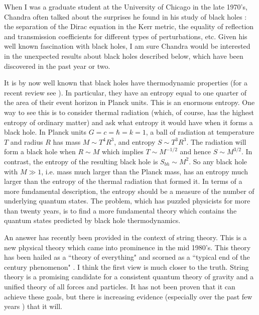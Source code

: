 
When I was a graduate student at the University of Chicago in the
late 1970's, Chandra often talked about the surprises he found in
his study of black holes \cite{chan}: the separation of the Dirac equation in
the Kerr metric, the equality of reflection and transmission
coefficients for different types of perturbations, etc. 
Given his well known fascination 
with black holes, I am sure Chandra would be interested in
the unexpected results about black holes described below,
which have been discovered in
the past year or two.

It is by now well known that black holes have
thermodynamic properties (for a recent
review see \cite{wald}). In particular, they have 
an entropy equal to one quarter of the area of their event horizon 
in Planck units.
This is an enormous entropy. One way to see this is to consider
thermal radiation (which, of course, has the highest entropy of ordinary matter)
and ask what entropy it would have when it forms a black hole. In
Planck units $G=c=\hbar=k=1$, a ball of radiation
at temperature $T$ and radius $R$ has mass $M\sim T^4 R^3$, and entropy
 $S\sim T^3 R^3$.
The radiation will form a black hole when $R\sim M$  which implies
$T \sim M^{-1/2}$ and hence $S\sim M^{3/2}$. In contrast, the entropy
of the resulting black hole is $S_{bh}\sim M^2$. So any black hole with
$M\gg 1$, i.e. mass much larger than the Planck mass, has an entropy
much larger than the entropy of the thermal radiation that formed it.
In terms of a more fundamental description, the entropy should be a measure
of the number of underlying 
quantum states. 
The problem, which has puzzled physicists for more than twenty years,
is to find a more fundamental theory which contains 
 the quantum states predicted by black hole thermodynamics.

An answer has recently been provided in the context of string theory.
This is a new physical theory which came into prominence in the mid
1980's. This theory has been hailed as a ``theory of everything" and
scorned as a ``typical end of the century phenomenon" \cite{anon}.
I think the first
view is much closer to the truth. String theory
is a promising candidate for a consistent quantum theory of gravity
and a unified theory of all forces and particles. It has not been proven
that it can achieve these goals, but there is increasing evidence
(especially over the past few years \cite{vafa}) that it will.

